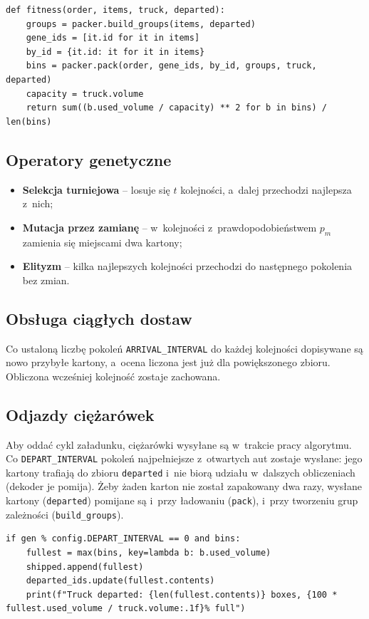 \documentclass[12pt]{article}
\begin{document}
\begin{lstlisting}
def fitness(order, items, truck, departed):
    groups = packer.build_groups(items, departed)
    gene_ids = [it.id for it in items]
    by_id = {it.id: it for it in items}
    bins = packer.pack(order, gene_ids, by_id, groups, truck, departed)
    capacity = truck.volume
    return sum((b.used_volume / capacity) ** 2 for b in bins) / len(bins)
\end{lstlisting}

\subsection{Operatory genetyczne}

\begin{itemize}
    \item \textbf{Selekcja turniejowa} -- losuje się $t$ kolejności, a~dalej przechodzi najlepsza z~nich;
    \item \textbf{Mutacja przez zamianę} -- w~kolejności z~prawdopodobieństwem $p_m$ zamienia się miejscami dwa kartony;
    \item \textbf{Elityzm} -- kilka najlepszych kolejności przechodzi do następnego pokolenia bez zmian.
\end{itemize}

\subsection{Obsługa ciągłych dostaw}

Co ustaloną liczbę pokoleń \texttt{ARRIVAL\_INTERVAL} do każdej kolejności dopisywane są nowo przybyłe kartony, a~ocena liczona jest już dla powiększonego zbioru. Obliczona wcześniej kolejność zostaje zachowana.

\subsection{Odjazdy ciężarówek}

Aby oddać cykl załadunku, ciężarówki wysyłane są w~trakcie pracy algorytmu. Co \texttt{DEPART\_INTERVAL} pokoleń najpełniejsze z~otwartych aut zostaje wysłane: jego kartony trafiają do zbioru \texttt{departed} i~nie biorą udziału w~dalszych obliczeniach (dekoder je pomija).
Żeby żaden karton nie został zapakowany dwa razy, wysłane kartony (\texttt{departed}) pomijane są i~przy ładowaniu (\texttt{pack}), i~przy tworzeniu grup zależności (\texttt{build\_groups}).

\begin{lstlisting}
if gen % config.DEPART_INTERVAL == 0 and bins:
    fullest = max(bins, key=lambda b: b.used_volume)
    shipped.append(fullest)
    departed_ids.update(fullest.contents)
    print(f"Truck departed: {len(fullest.contents)} boxes, {100 * fullest.used_volume / truck.volume:.1f}% full")
\end{lstlisting}
\end{document}
